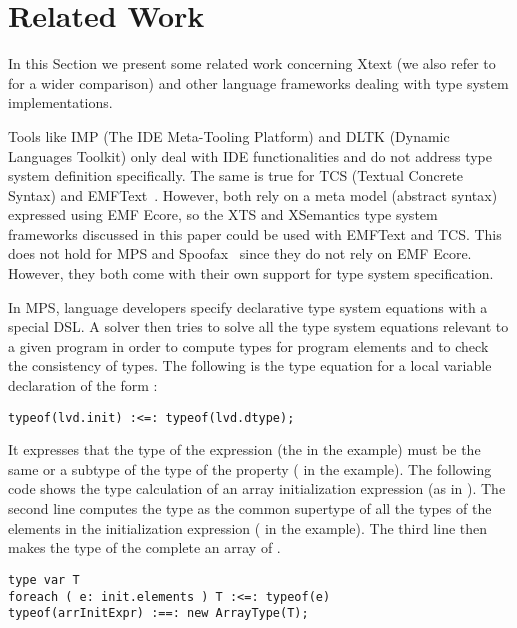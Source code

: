 \section{Related Work}
\label{sec:related}

In this Section we present some related work
concerning Xtext (we also refer to \cite{PP08} for a wider comparison)
and other language frameworks dealing with type system implementations.

\newcommand{\xtext}{Xtext}

Tools like IMP (The IDE Meta-Tooling Platform) \cite{imp09} and DLTK (Dynamic
Languages Toolkit) \cite{DLTK} only deal with IDE functionalities and do not
address type system definition specifically. 
The same is true for TCS (Textual Concrete Syntax) \cite{tcs}  
and EMFText~\cite{emftext09}. However, both rely on a meta model (abstract
syntax) expressed using EMF Ecore, so the XTS and XSemantics type system
frameworks discussed in this paper could be used with EMFText and TCS. 
This does not hold for MPS \cite{MPS} and Spoofax~\cite{Spoofax2010}
since they do not rely on EMF Ecore. However, they both come with their own
support for type system specification.

In MPS, language developers specify declarative type system equations with a
special DSL. A solver then tries to solve all the type system equations relevant
to a given program in order to compute types for program elements and to check
the consistency of types. The following is the type equation for a local
variable declaration of the form :

\begin{lstlisting}[language=MPS]
typeof(lvd.init) :<=: typeof(lvd.dtype);
\end{lstlisting}

\noindent
It expresses that the type of the  expression (the  in the
example) must be the same or a subtype of the type of the  property
( in the example). The following code shows the type calculation of an
array initialization expression (as in ). The second line
computes the type  as the common supertype of all the types of the
elements in the initialization expression ( in the example). The third
line then makes the type of the complete  an array of .

\begin{lstlisting}[language=MPS]
type var T
foreach ( e: init.elements ) T :<=: typeof(e)
typeof(arrInitExpr) :==: new ArrayType(T);
\end{lstlisting}

